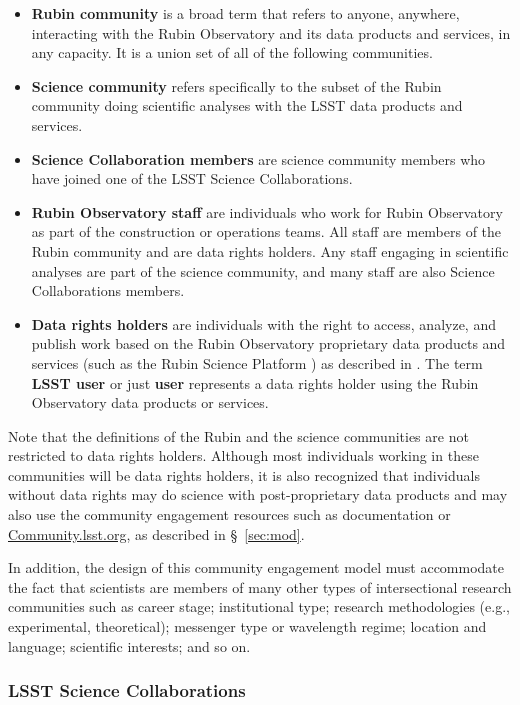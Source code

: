 \documentclass[DM,lsstdraft,toc]{lsstdoc}
\begin{document}
\begin{itemize}
\item \textbf{Rubin community} is a broad term that refers to anyone, anywhere, interacting with the Rubin Observatory and its data products and services, in any capacity. It is a union set of all of the following communities.
\item \textbf{Science community} refers specifically to the subset of the Rubin community doing scientific analyses with the LSST data products and services.
\item \textbf{Science Collaboration members} are science community members who have joined one of the LSST Science Collaborations.
\item \textbf{Rubin Observatory staff} are individuals who work for Rubin Observatory as part of the construction or operations teams. All staff are members of the Rubin community and are data rights holders. Any staff engaging in scientific analyses are part of the science community, and many staff are also Science Collaborations members.
\item \textbf{Data rights holders} are individuals with the right to access, analyze, and publish work based on the Rubin Observatory proprietary data products and services (such as the Rubin Science Platform ) as described in . The term \textbf{LSST user} or just \textbf{user} represents a data rights holder using the Rubin Observatory data products or services.
\end{itemize}

Note that the definitions of the Rubin and the science communities are not restricted to data rights holders. 
Although most individuals working in these communities will be data rights holders, it is also recognized that individuals without data rights may do science with post-proprietary data products  and may also use the community engagement resources such as documentation or \url{Community.lsst.org}, as described in \S~\ref{sec:mod}.

In addition, the design of this community engagement model must accommodate the fact that scientists are members of many other types of intersectional research communities such as career stage; institutional type; research methodologies (e.g., experimental, theoretical); messenger type or wavelength regime; location and language; scientific interests; and so on.


\subsubsection{LSST Science Collaborations}\label{sssec:intro_comms_scicoll}
\end{document}
